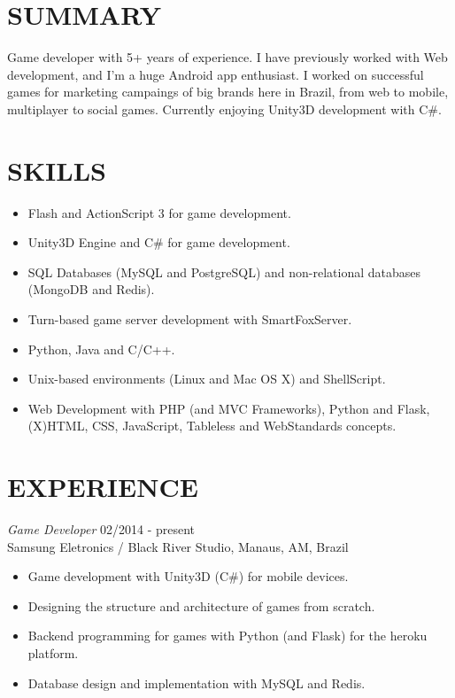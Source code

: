 \documentclass[line,margin]{res}
\begin{document}

\address{Rua Dezenove, 63, Cond. Itas, Itapema-303 - Manaus, AM - Brazil}
\address{+55 11 999326440 - bruno@croci.me - \href{http://bruno.croci.me/}{http://bruno.croci.me/}}

 
\begin{resume}
 
\section{SUMMARY} Game developer with 5+ years of experience. I have previously worked with Web development, and I'm a huge Android app enthusiast. I worked on successful games for marketing campaings of big brands here in Brazil, from web to mobile, multiplayer to social games. Currently enjoying Unity3D development with C\#.
 
\section{SKILLS} \begin{itemize}  \itemsep 1.25pt
				 \item Flash and ActionScript 3 for game development.
				 \item Unity3D Engine and C\# for game development.
                 \item SQL Databases (MySQL and PostgreSQL) and non-relational databases (MongoDB and Redis).
                 \item Turn-based game server development with SmartFoxServer.
                 \item Python, Java and C/C++.
                 \item Unix-based environments (Linux and Mac OS X) and ShellScript.
                 \item Web Development with PHP (and MVC Frameworks), Python and Flask, (X)HTML, CSS, JavaScript, 
                       Tableless and WebStandards concepts.
                 \end{itemize}
 
\section{EXPERIENCE} {\sl Game Developer} \hfill 02/2014 - present \\
                Samsung Eletronics / Black River Studio, Manaus, AM, Brazil
                 \begin{itemize}  \itemsep 1.25pt
                 \item Game development with Unity3D (C\#) for mobile devices.
				 \item Designing the structure and architecture of games from scratch.
				 \item Backend programming for games with Python (and Flask) for the heroku platform.
                 \item Database design and implementation with MySQL and Redis.
                 \end{itemize}
                 

\end{resume}
\end{document}
